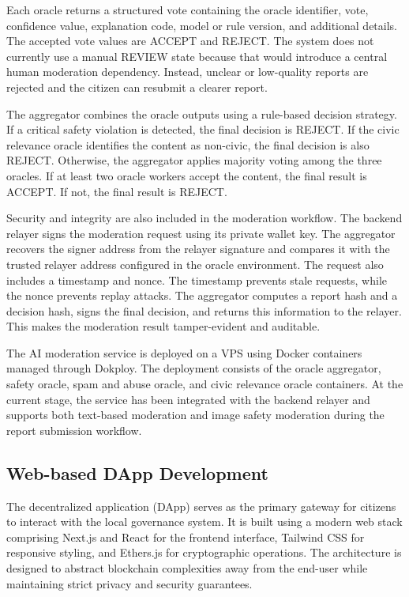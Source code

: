 Each oracle returns a structured vote containing the oracle identifier, vote, confidence value, explanation code, model or rule version, and additional details. The accepted vote values are ACCEPT and REJECT. The system does not currently use a manual REVIEW state because that would introduce a central human moderation dependency. Instead, unclear or low-quality reports are rejected and the citizen can resubmit a clearer report.

The aggregator combines the oracle outputs using a rule-based decision strategy. If a critical safety violation is detected, the final decision is REJECT. If the civic relevance oracle identifies the content as non-civic, the final decision is also REJECT. Otherwise, the aggregator applies majority voting among the three oracles. If at least two oracle workers accept the content, the final result is ACCEPT. If not, the final result is REJECT.

Security and integrity are also included in the moderation workflow. The backend relayer signs the moderation request using its private wallet key. The aggregator recovers the signer address from the relayer signature and compares it with the trusted relayer address configured in the oracle environment. The request also includes a timestamp and nonce. The timestamp prevents stale requests, while the
nonce prevents replay attacks. The aggregator computes a report hash and a decision hash, signs the final decision, and returns this information to the relayer. This makes the moderation result tamper-evident and auditable.

The AI moderation service is deployed on a VPS using Docker containers managed through Dokploy. The deployment consists of the oracle aggregator, safety oracle, spam and abuse oracle, and civic relevance oracle containers. At the current stage, the service has been integrated with the backend relayer and supports both text-based moderation and image safety moderation during the report submission
workflow.




\subsection{Web-based DApp Development}
The decentralized application (DApp) serves as the primary gateway for citizens to interact with the local governance system. It is built using a modern web stack comprising Next.js and React for the frontend interface, Tailwind CSS for responsive styling, and Ethers.js for cryptographic operations. The architecture is designed to abstract blockchain complexities away from the end-user while maintaining strict privacy and security guarantees.

